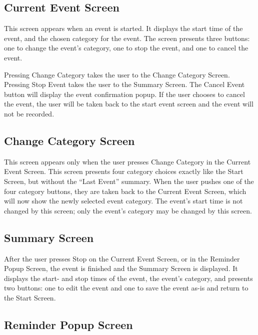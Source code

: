\documentclass[11pt]{article}
\newcommand{\bt}[1]{{\sc #1}}
\begin{document}
\subsection{Current Event Screen}

This screen appears when an event is started. It displays the start time of the event, and the chosen category for the event. The screen presents three buttons: one to change the event's category, one to stop the event, and one to cancel the event.

Pressing \bt{Change Category} takes the user to the Change Category Screen. Pressing \bt{Stop Event} takes the user to the Summary Screen. The \bt{Cancel Event} button will display the event confirmation popup. If the user chooses to cancel the event, the user will be taken back to the start event screen and the event will not be recorded.

\subsection{Change Category Screen}

This screen appears only when the user presses \bt{Change Category} in the Current Event Screen. This screen presents four category choices exactly like the Start Screen, but without the ``Last Event'' summary. When the user pushes one of the four category buttons, they are taken back to the Current Event Screen, which will now show the newly selected event category. The event's start time is not changed by this screen; only the event's category may be changed by this screen.

\subsection{Summary Screen}

After the user presses \bt{Stop}  on the Current Event Screen, or in the Reminder Popup Screen, the event is finished and the Summary Screen is displayed. It displays the start- and stop times of the event, the event's category, and presents two buttons: one to edit the event and one to save the event as-is and return to the Start Screen.

\subsection{Reminder Popup Screen}
\end{document}
